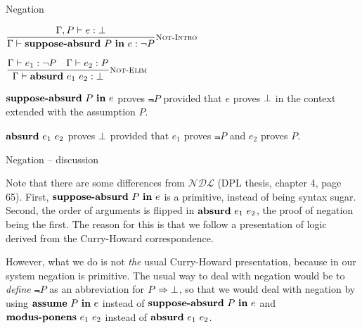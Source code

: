 \documentclass{beamer}
\newcommand{\NDL}{\mathcal{NDL}}
\begin{document}
\begin{frame}{Negation}

\begin{center}
  $\infrule[Not-Intro]{\proves[\assume{\Gamma}{P}]{e}{\False}}{\proves{\notintro{P}{e}}{\Not{P}}}$

  \vspace{2em}

  $\infrule[Not-Elim]{\proves{e_1}{\Not{P}} \quad \proves{e_2}{P}}{\proves{\notelim{e_1}{e_2}}{\False}}$
\end{center}

\vspace{2em}

$\textbf{suppose-absurd}\ P\ \textbf{in}\ e$ proves $\Not{P}$ provided that $e$ proves $\bot$ in the context extended with the assumption $P$.

\vspace{2em}

$\textbf{absurd}\ e_1\ e_2$ proves $\bot$ provided that $e_1$ proves $\Not{P}$ and $e_2$ proves $P$.

\end{frame}

\begin{frame}{Negation -- discussion}

Note that there are some differences from $\NDL$ (DPL thesis, chapter 4, page 65). First, $\textbf{suppose-absurd}\ P\ \textbf{in}\ e$ is a primitive, instead of being syntax sugar. Second, the order of arguments is flipped in $\textbf{absurd}\ e_1\ e_2$, the proof of negation being the first. The reason for this is that we follow a presentation of logic derived from the Curry-Howard correspondence.

\vspace{2em}

However, what we do is not \textit{the} usual Curry-Howard presentation, because in our system negation is primitive. The usual way to deal with negation would be to \textit{define} $\Not{P}$ as an abbreviation for $P \Rightarrow \bot$, so that we would deal with negation by using $\textbf{assume}\ P\ \textbf{in}\ e$ instead of $\textbf{suppose-absurd}\ P\ \textbf{in}\ e$ and $\textbf{modus-ponens}\ e_1\ e_2$ instead of $\textbf{absurd}\ e_1\ e_2$.

\end{frame}
\end{document}
